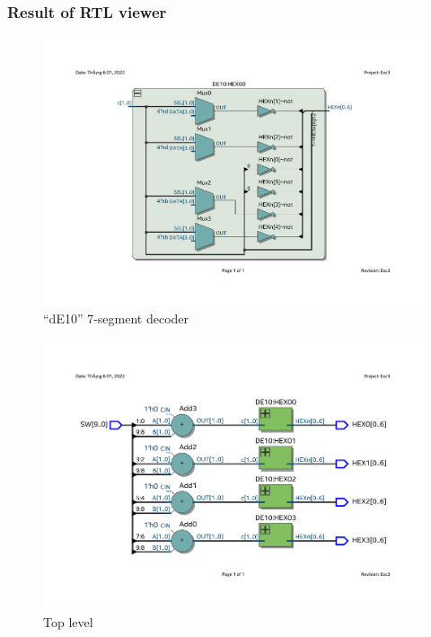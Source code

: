 \documentclass[13pt,a4paper]{report}
\begin{document}
\subsubsection{Result of RTL viewer}
\begin{figure}[H]
\centering
\includegraphics[scale=0.5, clip, trim={2cm 3.5cm 2cm 4cm}]{images/Exc3_HEX_RTL.pdf}
\caption*{``dE10'' 7-segment decoder}
\end{figure}

\begin{figure}[H]
\centering
\includegraphics[scale=0.5, clip, trim={2cm 3.8cm 2cm 3.8cm}]{images/Exc3_RTL.pdf}
\caption*{Top level}
\end{figure}
\end{document}
